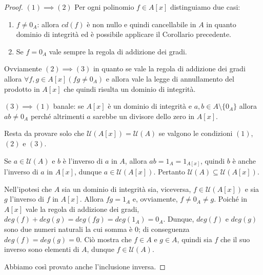 \begin{proof}
	$(1) \implies (2)$ Per ogni polinomio $f \in A[x]$ distinguiamo due casi:
	\begin{enumerate}
		\item $f\neq 0_{A}$: allora $cd(f)$ è non nullo e quindi cancellabile in $A$ in quanto dominio di integrità ed è possibile applicare il Corollario precedente.
		\item Se $f=0_{A}$ vale sempre la regola di addizione dei gradi.
	\end{enumerate}
	
	Ovviamente $(2) \implies (3)$ in quanto se vale la regola di addizione dei gradi allora $\forall f,g  \in A[x] (fg \neq 0_{A})$ e allora vale la legge di annullamento del prodotto in $A[x]$ che quindi risulta un dominio di integrità.
	
	$(3) \implies (1)$ banale: se $A[x]$ è un dominio di integrità e $a,b \in A \setminus \{0_{A}\}$ allora $ab \neq 0_{A}$ perché altrimenti $a$ sarebbe un divisore dello zero in $A[x]$.
	
	Resta da provare solo che $\mathcal{U}(A[x])= \mathcal{U}(A)$ se valgono le condizioni $(1)$, $(2)$ e $(3)$.
	
	Se $a \in \mathcal{U}(A)$ e $b$ è l'inverso di $a$ in $A$, allora $ab = 1_{A} = 1_{A[x]}$, quindi $b$ è anche l'inverso di $a$ in $A[x]$, dunque $a \in \mathcal{U}(A[x])$. Pertanto $\mathcal{U}(A)\subseteq \mathcal{U}(A[x])$.
	
	Nell'ipotesi che $A$ sia un dominio di integrità sia, viceversa, $f \in \mathcal{U}(A[x])$ e sia $g$ l'inverso di $f$ in $A[x]$. Allora $fg=1_{A}$ e, ovviamente, $f \neq 0_{A} \neq g$. Poiché in $A[x]$ vale la regola di addizione dei gradi, $deg(f) + deg(g) = deg(fg)=deg(1_{A})=0_{A}$. Dunque, $deg(f)$ e $deg(g)$ sono due numeri naturali la cui somma è $0$; di conseguenza $deg(f) = deg(g) = 0$. Ciò mostra che $f \in A$ e $g \in A$, quindi sia $f$ che il suo inverso sono elementi di $A$, dunque $f \in \mathcal{U}(A)$.
	
	Abbiamo così provato anche l'inclusione inversa. 
\end{proof}



